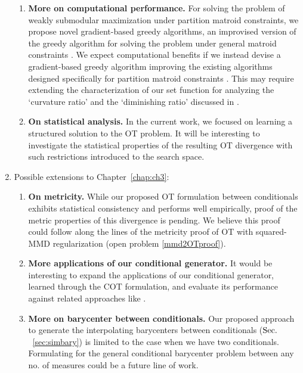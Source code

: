 \begin{enumerate}
\begin{enumerate}
        \item \textbf{More on computational performance.} For solving the problem of weakly submodular maximization under partition matroid constraints, we propose novel gradient-based greedy algorithms, an improvised version of the greedy algorithm for solving the problem under general matroid constraints \citep[Algorithm (1)]{pmlr-v80-chen18b}. We expect computational benefits if we instead devise a gradient-based greedy algorithm improving the existing algorithms designed specifically for partition matroid constraints \citep{partitionmalgo}. This may require extending the characterization of our set function for analyzing the `curvature ratio' and the `diminishing ratio' discussed in \cite{partitionmalgo}.
        \item \textbf{On statistical analysis.} In the current work, we focused on learning a structured solution to the OT problem. It will be interesting to investigate the statistical properties of the resulting OT divergence with such restrictions introduced to the search space.
    \end{enumerate}
\item{Possible extensions to Chapter~\ref{chap:ch3}:}
    \begin{enumerate}
        \item \textbf{On metricity.} While our proposed OT formulation between conditionals exhibits statistical consistency and performs well empirically, proof of the metric properties of this divergence is pending. We believe this proof could follow along the lines of the metricity proof of OT with squared-MMD regularization (open problem \ref{mmd2OTproof}).
        \item \textbf{More applications of our conditional generator.} It would be interesting to expand the applications of our conditional generator, learned through the COT formulation, and evaluate its performance against related approaches like \cite{Kim2022ConditionalWG}.
        \item \textbf{More on barycenter between conditionals.} Our proposed approach to generate the interpolating barycenters between conditionals ($\S$~\ref{sec:simbary}) is limited to the case when we have two conditionals. Formulating for the general conditional barycenter problem between any no. of measures could be a future line of work.
    \end{enumerate}
\end{enumerate}